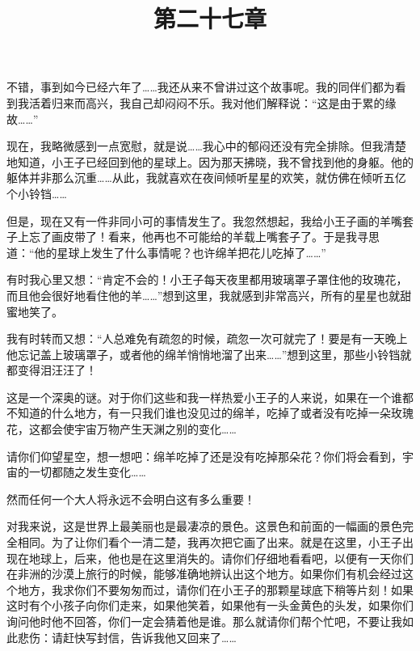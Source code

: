 {\startalignment[center]
 \stopalignment}

\title{第二十七章}

不错，事到如今已经六年了\ldots{}\ldots{}我还从来不曾讲过这个故事呢。我的同伴们都为看到我活着归来而高兴，我自己却闷闷不乐。我对他们解释说：“这是由于累的缘故\ldots{}\ldots{}”

现在，我略微感到一点宽慰，就是说\ldots{}\ldots{}我心中的郁闷还没有完全排除。但我清楚地知道，小王子已经回到他的星球上。因为那天拂晓，我不曾找到他的身躯。他的躯体并非那么沉重\ldots{}\ldots{}从此，我就喜欢在夜间倾听星星的欢笑，就仿佛在倾听五亿个小铃铛\ldots{}\ldots{}

但是，现在又有一件非同小可的事情发生了。我忽然想起，我给小王子画的羊嘴套子上忘了画皮带了！看来，他再也不可能给的羊载上嘴套子了。于是我寻思道：“他的星球上发生了什么事情呢？也许绵羊把花儿吃掉了\ldots{}\ldots{}”

有时我心里又想：“肯定不会的！小王子每天夜里都用玻璃罩子罩住他的玫瑰花，而且他会很好地看住他的羊\ldots{}\ldots{}”想到这里，我就感到非常高兴，所有的星星也就甜蜜地笑了。

我有时转而又想：“人总难免有疏忽的时候，疏忽一次可就完了！要是有一天晚上他忘记盖上玻璃罩子，或者他的绵羊悄悄地溜了出来\ldots{}\ldots{}”想到这里，那些小铃铛就都变得泪汪汪了！

这是一个深奥的谜。对于你们这些和我一样热爱小王子的人来说，如果在一个谁都不知道的什么地方，有一只我们谁也没见过的绵羊，吃掉了或者没有吃掉一朵玫瑰花，这都会使宇宙万物产生天渊之别的变化\ldots{}\ldots{}

请你们仰望星空，想一想吧：绵羊吃掉了还是没有吃掉那朵花？你们将会看到，宇宙的一切都随之发生变化\ldots{}\ldots{}

然而任何一个大人将永远不会明白这有多么重要！

对我来说，这是世界上最美丽也是最凄凉的景色。这景色和前面的一幅画的景色完全相同。为了让你们看个一清二楚，我再次把它画了出来。就是在这里，小王子出现在地球上，后来，他也是在这里消失的。请你们仔细地看看吧，以便有一天你们在非洲的沙漠上旅行的时候，能够准确地辨认出这个地方。如果你们有机会经过这个地方，我求你们不要匆匆而过，请你们在小王子的那颗星球底下稍等片刻！如果这时有个小孩子向你们走来，如果他笑着，如果他有一头金黄色的头发，如果你们询问他时他不回答，你们一定会猜着他是谁。那么就请你们帮个忙吧，不要让我如此悲伤：请赶快写封信，告诉我他又回来了\ldots{}\ldots{}

{\startalignment[center]
 \stopalignment}